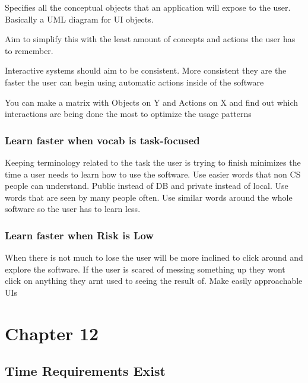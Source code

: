 \documentclass[11pt,]{article}
\begin{document}
Specifies all the conceptual objects that an application will expose to
the user. Basically a UML diagram for UI objects.

Aim to simplify this with the least amount of concepts and actions the
user has to remember.

Interactive systems should aim to be consistent. More consistent they
are the faster the user can begin using automatic actions inside of the
software

You can make a matrix with Objects on Y and Actions on X and find out
which interactions are being done the most to optimize the usage
patterns

\hypertarget{learn-faster-when-vocab-is-task-focused}{%
\subsubsection{Learn faster when vocab is
task-focused}\label{learn-faster-when-vocab-is-task-focused}}

Keeping terminology related to the task the user is trying to finish
minimizes the time a user needs to learn how to use the software. Use
easier words that non CS people can understand. Public instead of DB and
private instead of local. Use words that are seen by many people often.
Use similar words around the whole software so the user has to learn
less.

\hypertarget{learn-faster-when-risk-is-low}{%
\subsubsection{Learn faster when Risk is
Low}\label{learn-faster-when-risk-is-low}}

When there is not much to lose the user will be more inclined to click
around and explore the software. If the user is scared of messing
something up they wont click on anything they arnt used to seeing the
result of. Make easily approachable UIs

\hypertarget{chapter-12}{%
\section{Chapter 12}\label{chapter-12}}

\hypertarget{time-requirements-exist}{%
\subsection{Time Requirements Exist}\label{time-requirements-exist}}
\end{document}
